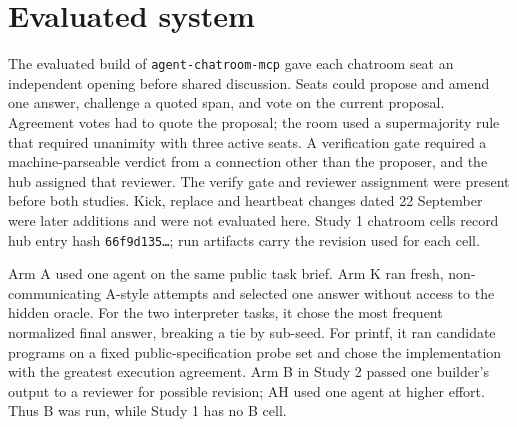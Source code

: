 \section{Evaluated system}
\label{sec:system}

The evaluated build of \texttt{agent-chatroom-mcp} gave each chatroom seat an independent opening before shared discussion. Seats could propose and amend one answer, challenge a quoted span, and vote on the current proposal. Agreement votes had to quote the proposal; the room used a supermajority rule that required unanimity with three active seats. A verification gate required a machine-parseable verdict from a connection other than the proposer, and the hub assigned that reviewer. The verify gate and reviewer assignment were present before both studies. Kick, replace and heartbeat changes dated 22 September were later additions and were not evaluated here. Study 1 chatroom cells record hub entry hash \texttt{66f9d135\ldots}; run artifacts carry the revision used for each cell.



Arm A used one agent on the same public task brief. Arm K ran fresh, non-communicating A-style attempts and selected one answer without access to the hidden oracle. For the two interpreter tasks, it chose the most frequent normalized final answer, breaking a tie by sub-seed. For printf, it ran candidate programs on a fixed public-specification probe set and chose the implementation with the greatest execution agreement. Arm B in Study 2 passed one builder's output to a reviewer for possible revision; AH used one agent at higher effort. Thus B was run, while Study 1 has no B cell.
